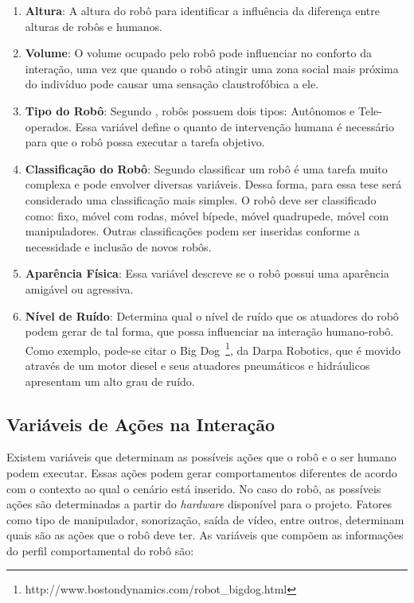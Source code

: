\begin{enumerate}
	\item \textbf{Altura}: A altura do robô para identificar a influência da diferença entre alturas de robôs e humanos.
	\item \textbf{Volume}: O volume ocupado pelo robô pode influenciar no conforto da interação, uma vez que quando o robô atingir uma zona social mais próxima do indivíduo pode causar uma sensação claustrofóbica a ele.
	\item \textbf{Tipo do Robô}: Segundo , robôs possuem dois tipos: Autônomos e Tele-operados. Essa variável define o quanto de intervenção humana é necessário para que o robô possa executar a tarefa objetivo.
	\item \textbf{Classificação do Robô}: Segundo  classificar um robô é uma tarefa muito complexa e pode envolver diversas variáveis. Dessa forma, para essa tese será considerado uma classificação mais simples. O robô deve ser classificado como: fixo, móvel com rodas, móvel bípede, móvel quadrupede, móvel com manipuladores. Outras classificações podem ser inseridas conforme a necessidade e inclusão de novos robôs.
	\item \textbf{Aparência Física}: Essa variável descreve se o robô possui uma aparência amigável ou agressiva.
	\item \textbf{Nível de Ruído}: Determina qual o nível de ruído que os atuadores do robô podem gerar de tal forma, que possa influenciar na interação humano-robô. Como exemplo, pode-se citar o Big Dog~\footnote{http://www.bostondynamics.com/robot\_bigdog.html}, da Darpa Robotics, que é movido através de um motor diesel e seus atuadores pneumáticos e hidráulicos apresentam um alto grau de ruído.
\end{enumerate}

\subsection{Variáveis de Ações na Interação}
\label{sec:acoes}
Existem variáveis que determinam as possíveis ações que o robô e o ser humano podem executar. Essas ações podem gerar comportamentos diferentes de acordo com o contexto ao qual o cenário está inserido. No caso do robô, as possíveis ações são determinadas a partir do \emph{hardware} disponível para o projeto. Fatores como tipo de manipulador, sonorização, saída de vídeo, entre outros, determinam quais são as ações que o robô deve ter. As variáveis que compõem as informações do perfil comportamental do robô são:

